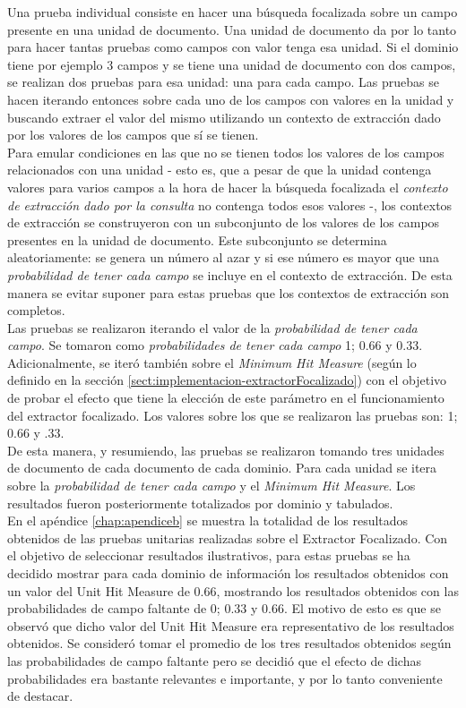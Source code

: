 Una prueba individual consiste en hacer una búsqueda focalizada sobre un campo presente en una unidad de documento. Una unidad de documento da por lo tanto para hacer tantas pruebas como campos con valor tenga esa unidad. Si el dominio tiene por ejemplo 3 campos y se tiene una unidad de documento con dos campos, se realizan dos pruebas para esa unidad: una para cada campo. Las pruebas se hacen iterando entonces sobre cada uno de los campos con valores en la unidad y buscando extraer el valor del mismo utilizando un contexto de extracción dado por los valores de los campos que sí se tienen. \\ 

Para emular condiciones en las que no se tienen todos los valores de los campos relacionados con una unidad - esto es, que a pesar de que la unidad contenga valores para varios campos a la hora de hacer la búsqueda focalizada el \emph{contexto de extracción dado por la consulta} no contenga todos esos valores -, los contextos de extracción se construyeron con un subconjunto de los valores de los campos presentes en la unidad de documento. Este subconjunto se determina aleatoriamente: se genera un número al azar y si ese número es mayor que una \emph{probabilidad de tener cada campo} se incluye en el contexto de extracción. De esta manera se evitar suponer para estas pruebas que los contextos de extracción son completos.\\

Las pruebas se realizaron iterando el valor de la \emph{probabilidad de tener cada campo}. Se tomaron como \emph{probabilidades de tener cada campo} 1; 0.66 y 0.33. Adicionalmente, se iteró también sobre el \emph{Minimum Hit Measure} (según lo definido en la sección \ref{sect:implementacion-extractorFocalizado}) con el objetivo de probar el efecto que tiene la elección de este parámetro en el funcionamiento del extractor focalizado. Los valores sobre los que se realizaron las pruebas son: 1; 0.66 y .33.\\

De esta manera, y resumiendo, las pruebas se realizaron tomando tres unidades de documento de cada documento de cada dominio. Para cada unidad se itera sobre la \emph{probabilidad de tener cada campo} y el \emph{Minimum Hit Measure}. Los resultados fueron posteriormente totalizados por dominio y tabulados. \\

En el apéndice \ref{chap:apendiceb} se muestra la totalidad de los resultados obtenidos de las pruebas unitarias realizadas sobre el Extractor Focalizado. Con el objetivo de seleccionar resultados ilustrativos, para estas pruebas se ha decidido mostrar para cada dominio de información los resultados obtenidos con un valor del Unit Hit Measure de 0.66, mostrando los resultados obtenidos con las probabilidades de campo faltante de 0; 0.33 y 0.66. El motivo de esto es que se observó que dicho valor del Unit Hit Measure era representativo de los resultados obtenidos. Se consideró tomar el promedio de los tres resultados obtenidos según las probabilidades de campo faltante pero se decidió que el efecto de dichas probabilidades era bastante relevantes e importante, y por lo tanto conveniente de destacar.\\

